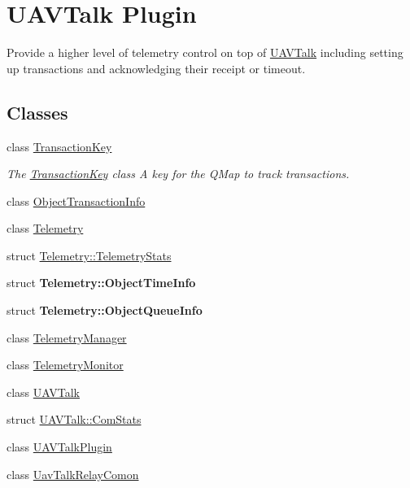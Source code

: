 \hypertarget{group___u_a_v_talk_plugin}{\section{\-U\-A\-V\-Talk \-Plugin}
\label{group___u_a_v_talk_plugin}
}


\-Provide a higher level of telemetry control on top of \hyperlink{class_u_a_v_talk}{\-U\-A\-V\-Talk} including setting up transactions and acknowledging their receipt or timeout.  


\subsection*{\-Classes}
\begin{DoxyCompactItemize}
\item 
class \hyperlink{class_transaction_key}{\-Transaction\-Key}
\begin{DoxyCompactList}\small\item\em \-The \hyperlink{class_transaction_key}{\-Transaction\-Key} class \-A key for the \-Q\-Map to track transactions. \end{DoxyCompactList}\item 
class \hyperlink{class_object_transaction_info}{\-Object\-Transaction\-Info}
\item 
class \hyperlink{class_telemetry}{\-Telemetry}
\item 
struct \hyperlink{struct_telemetry_1_1_telemetry_stats}{\-Telemetry\-::\-Telemetry\-Stats}
\item 
struct {\bfseries \-Telemetry\-::\-Object\-Time\-Info}
\item 
struct {\bfseries \-Telemetry\-::\-Object\-Queue\-Info}
\item 
class \hyperlink{class_telemetry_manager}{\-Telemetry\-Manager}
\item 
class \hyperlink{class_telemetry_monitor}{\-Telemetry\-Monitor}
\item 
class \hyperlink{class_u_a_v_talk}{\-U\-A\-V\-Talk}
\item 
struct \hyperlink{struct_u_a_v_talk_1_1_com_stats}{\-U\-A\-V\-Talk\-::\-Com\-Stats}
\item 
class \hyperlink{class_u_a_v_talk_plugin}{\-U\-A\-V\-Talk\-Plugin}
\item 
class \hyperlink{class_uav_talk_relay_comon}{\-Uav\-Talk\-Relay\-Comon}
\end{DoxyCompactItemize}
